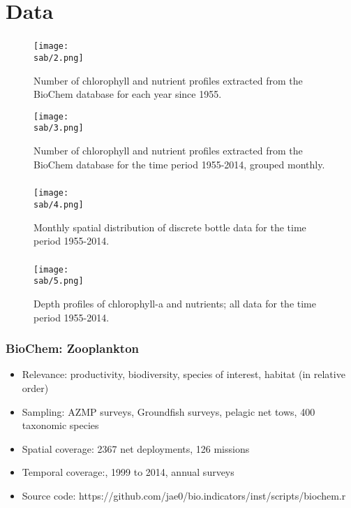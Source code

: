 \documentclass{beamer}
\numberwithin{equation}{section}		%
\numberwithin{figure}{section}		%
\numberwithin{table}{section}				%
\newcommand{\D}{.}
\newcommand{\bd}{\string~/bio\D data}   %
\newcommand{\sab}{\bd/mpa/sab}   %
\begin{document}
\section{Data}
\begin{frame}
  \frametitle{}
      \begin{figure}
        \centering
        \texttt{[image: \\sab/2.png]}
        \caption{Number of chlorophyll and nutrient profiles extracted from the BioChem database for each year since 1955.}
        \label{fig:ChloroMap}
      \end{figure}
      \begin{figure}
        \centering
        \texttt{[image: \\sab/3.png]}
        \caption{Number of chlorophyll and nutrient profiles extracted from the BioChem database for the time period 1955-2014, grouped monthly.}
        \label{fig:ChloroFreq}
      \end{figure}
\end{frame}



\begin{frame}[shrink]
  \frametitle{}
  \begin{figure}
    \centering
    \texttt{[image: \\sab/4.png]}
    \caption{Monthly spatial distribution of discrete bottle data for the time period 1955-2014.}
    \label{fig:BottleMap}
  \end{figure}
\end{frame}



\begin{frame}
  \frametitle{}
  \begin{figure}
    \centering
    \texttt{[image: \\sab/5.png]}
    \caption{Depth profiles of chlorophyll-a and nutrients; all data for the time period 1955-2014.}
    \label{fig:ChloroProfiles}
  \end{figure}
\end{frame}




\begin{frame}
  \frametitle{BioChem: Zooplankton}
  \begin{itemize}  
    \item Relevance:  productivity, biodiversity, species of interest, habitat (in relative order)
    \item Sampling:  AZMP surveys, Groundfish surveys, pelagic net tows, 400 taxonomic species
    \item Spatial coverage: 2367 net deployments, 126 missions 
    \item Temporal coverage:,  1999 to 2014, annual surveys
    \item Source code: https://github.com/jae0/bio.indicators/inst/scripts/biochem.r
  \end{itemize}
\end{frame}
\end{document}

